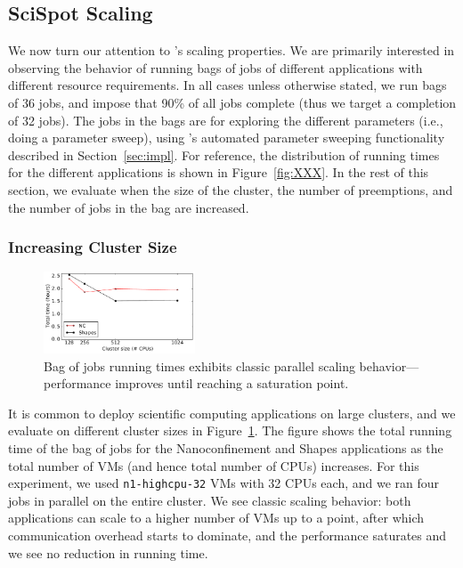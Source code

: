 
\subsection{SciSpot Scaling}
We now turn our attention to \sysname's scaling properties. We are primarily interested in observing the behavior of running bags of jobs of different applications with different resource requirements.
In all cases unless otherwise stated, we run bags of 36 jobs, and impose that 90\% of all jobs complete (thus we target a completion of 32 jobs).
The jobs in the bags are for exploring the different parameters (i.e., doing a parameter sweep), using \sysname's automated parameter sweeping functionality described in Section~\ref{sec:impl}. For reference, the distribution of running times for the different applications is shown in Figure~\ref{fig:XXX}. 
In the rest of this section, we evaluate \sysname when the size of the cluster, the number of preemptions, and the number of jobs in the bag are increased. 

\subsubsection{Increasing Cluster Size} 

\begin{figure}
  \includegraphics[width=0.4\textwidth]{../graphs/vm-per-job-scaling.pdf}
      \vspace*{\myfigspace}
  \caption{Bag of jobs running times exhibits classic parallel scaling behavior---performance improves until reaching a saturation point.}
  \label{fig:vm-per-job-scaling}
    \vspace*{\myfigspace}
\end{figure}

It is common to deploy scientific computing applications on large clusters, and we evaluate \sysname on different cluster sizes in Figure~\ref{fig:vm-per-job-scaling}.
The figure shows the total running time of the bag of jobs for the Nanoconfinement and Shapes applications as the total number of VMs (and hence total number of CPUs) increases.
For this experiment, we used \texttt{n1-highcpu-32} VMs with 32 CPUs each, and we ran four jobs in parallel on the entire cluster. 
We see classic scaling behavior: both applications can scale to a higher number of VMs up to a point, after which communication overhead starts to dominate, and the performance saturates and we see no reduction in running time. 


